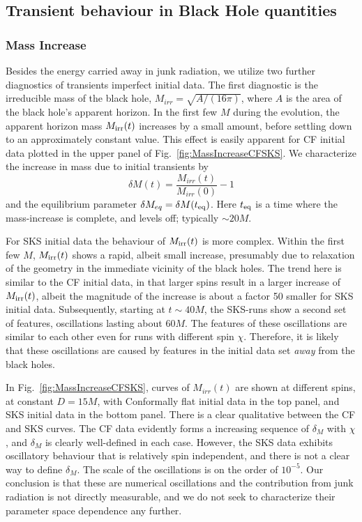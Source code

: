\subsection{Transient behaviour in Black Hole quantities}

\subsubsection{Mass Increase}
Besides the energy carried away in junk radiation, we utilize two further
diagnostics of transients  imperfect initial data.
The first diagnostic is the irreducible
mass of the black hole, $M_{irr} = \sqrt{A/(16\pi)}$, where $A$
is the area of the black hole's apparent horizon. 
In the first few $M$ during the evolution, the apparent horizon mass
$M_{\rm irr}(t)$ increases by a small amount, before settling down to
an approximately constant value. This effect is easily apparent for CF initial data plotted in the upper panel of Fig.~\ref{fig:MassIncreaseCFSKS}.
We characterize the increase in mass due to initial transients by 
\begin{equation}
\delta M(t)=\frac{M_{irr}(t)}{M_{irr}(0)}-1
\end{equation}
and the equilibrium parameter $\delta M_{eq} = \delta M(t_{\rm eq})$.
Here $t_{\rm eq}$ is a time where the mass-increase is complete, and
levels off; typically $\sim20M$. 

For SKS initial data the behaviour of $M_{\rm irr}(t)$ is more
  complex.  Within the first few $M$, $M_{\rm irr}(t)$ shows a rapid,
  albeit small increase, presumably due to relaxation of the geometry
  in the immediate vicinity of the black holes.  The trend here is
  similar to the CF initial data, in that larger spins result in a
  larger increase of $M_{\rm irr}(t)$, albeit the magnitude of the
  increase is about a factor 50 smaller for SKS initial data.
  Subsequently, starting at $t\sim 40M$, the SKS-runs show a second
  set of features,  oscillations  lasting about
  $60M$.  The features of these oscillations are similar to each other even for runs with different spin $\chi$.  Therefore, it is
  likely that these oscillations are caused by features in the initial
  data set {\em away} from the black holes.

{\footnotesize {}
In Fig.~\ref{fig:MassIncreaseCFSKS}, curves of $M_{irr}(t)$ are
shown at different spins, at constant $D=15M$, with Conformally flat
initial data in the top panel, and SKS initial data in the bottom
panel. There is a clear qualitative between the CF and SKS curves. The CF data evidently forms a increasing sequence of $\delta_M$ with
$\chi$, and $\delta_M$ is clearly well-defined in each case. However,
the SKS data exhibits oscillatory behaviour that is relatively spin
independent, and there is not a clear way to define $\delta_M$. The
scale of the oscillations is on the order of $10^{-5}$. Our conclusion
is that these are numerical oscillations and the contribution from
junk radiation is not directly measurable, and we do not seek to
characterize their parameter space dependence any further.}

